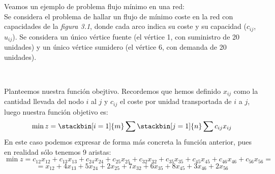 \begin{ejem} Veamos un ejemplo de problema flujo mínimo en una red:\\

Se considera el problema de hallar un flujo de mínimo coste en la red con capacidades de la \textit{figura 3.1}, donde cada arco indica su coste y su capacidad ($c_{ij}$, $u_{ij}$). Se considera un único vértice fuente (el vértice 1, con suministro de 20 unidades) y un único vértice sumidero (el vértice 6, con demanda de 20 unidades).\newpage

\begin{figura}\ \begin{center}\end{center}\end{figura}

Planteemos nuestra función obejtivo. Recordemos que hemos definido $x_{ij}$ como la cantidad llevada del nodo $i$ al $j$ y $c_{ij}$ el coste por unidad transportada de $i$ a $j$, luego nuestra función objetivo es:
\[\min z=\stackbin[i=1]{m}\sum\stackbin[j=1]{n}\sum c_{ij}x_{ij}\] En este caso podemos expresar de forma más concreta la función anterior, pues en realidad sólo tenemos 9 aristas:
\[\min z=c_{12}x_{12}+c_{13}x_{13}+c_{24}x_{24}+c_{25}x_{25}+c_{32}x_{32}+c_{35}x_{35}+c_{45}x_{45}+c_{46}x_{46}+c_{56}x_{56}=\]
\[=x_{12}+4x_{13}+5x_{24}+2x_{25}+7x_{32}+6x_{35}+8x_{45}+3x_{46}+2x_{56}\]


\end{ejem}
